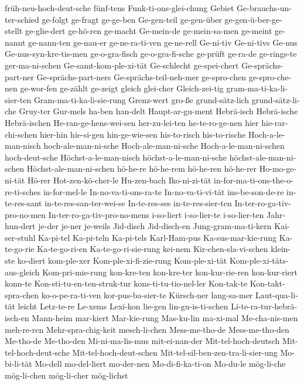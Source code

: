 {früh-neu-hoch-deut-sche
fünf-tens
Funk-ti-ons-glei-chung
Gebiet
Ge-brauchs-un-ter-schied
ge-folgt
ge-fragt
ge-ge-ben
Ge-gen-teil
ge-gen-über
ge-gen-ü-ber-ge-stellt
ge-glie-dert
ge-hö-ren
ge-macht
Ge-mein-de
ge-mein-sa-men
ge-meint
ge-nannt
ge-nann-ten
ge-nau-er
ge-ne-ra-ti-ven
ge-ne-rell
Ge-ni-tiv
Ge-ni-tivs
Ge-nus
Ge-nus-syn-kre-tis-men
ge-o-gra-fisch
ge-o-gra-fi-sche
ge-prüft
ge-ra-de
ge-rings-te
ger-ma-ni-schen
Ge-samt-kom-ple-xi-tät
Ge-schlecht
ge-spei-chert
Ge-sprächs-part-ner
Ge-sprächs-part-ners
Ge-sprächs-teil-neh-mer
ge-spro-chen
ge-spro-che-nen
ge-wor-fen
ge-zählt
ge-zeigt
gleich
glei-cher
Gleich-zei-tig
gram-ma-ti-ka-li-sier-ten
Gram-ma-ti-ka-li-sie-rung
Grenz-wert
gro-ße
grund-sätz-lich
grund-sätz-li-che
Gruy-ter
Gur-mels
ha-ben
han-delt
Haupt-ar-gu-ment
Hebrä-isch
Hebrä-ische
Hebrä-ischen
He-ran-ge-hens-wei-sen
her-zu-lei-ten
he-te-ro-ge-nen
hier
hie-rar-chi-schen
hier-hin
hie-si-gen
hin-ge-wie-sen
his-to-risch
his-to-rische
Hoch-a-le-man-nisch
hoch-ale-man-ni-sche
Hoch-ale-man-ni-sche
Hoch-a-le-man-ni-schen
hoch-deut-sche
Höchst-a-le-man-nisch
höchst-a-le-man-ni-sche
höchst-ale-man-ni-schen
Höchst-ale-man-ni-schen
hö-he-re
hö-he-rem
hö-he-ren
hö-he-rer
Ho-mo-ge-ni-tät
Hö-rer
Hot-zen-kö-cher-le
Hu-zen-bach
Iko-ni-zi-tät
in-for-ma-ti-ons-the-o-re-ti-sches
in-for-mel-le
In-no-va-ti-ons-ra-te
In-no-va-ti-vi-tät
ins-be-son-de-re
in-te-res-sant
in-te-res-san-ter-wei-se
In-te-res-ses
in-te-res-sier-ten
In-ter-ro-ga-tiv-pro-no-men
In-ter-ro-ga-tiv-pro-no-mens
i-so-liert
i-so-lier-te
i-so-lier-ten
Jahr-hun-dert
je-der
je-ner
je-weils
Jid-disch
Jid-disch-en
Jung-gram-ma-ti-kern
Kai-ser-stuhl
Ka-pi-tel
Ka-pi-teln
Ka-pi-tels
Karl-Ham-pus
Ka-sus-mar-kie-rung
Ka-te-go-rie
Ka-te-go-ri-en
Ka-te-go-ri-sie-rung
kei-nem
Kir-chen-sla-vi-schen
klein-ste
ko-diert
kom-ple-xer
Kom-ple-xi-fi-zie-rung
Kom-ple-xi-tät
Kom-ple-xi-täts-aus-gleich
Kom-pri-mie-rung
kon-kre-ten
kon-kre-ter
kon-kur-rie-ren
kon-kur-riert
konn-te
Kon-sti-tu-en-ten-struk-tur
kons-ti-tu-tio-nel-ler
Kon-tak-te
Kon-takt-spra-chen
ko-o-pe-ra-ti-ven
kor-pus-ba-sier-te
Kürsch-ner
lang-sa-mer
Laut-qua-li-tät
leicht
Letz-te-re
Le-xems
Lexi-kon
lie-gen
lin-gu-is-ti-schen
Li-te-ra-tur-hebrä-isch-en
Mann-heim
mar-kiert
Mar-kie-rung
Mas-ku-lin
ma-xi-mal
Me-cha-nis-men
meh-re-ren
Mehr-spra-chig-keit
mesch-li-chen
Mess-me-tho-de
Mess-me-tho-den
Me-tho-de
Me-tho-den
Mi-ni-ma-lis-mus
mit-ei-nan-der
Mit-tel-hoch-deutsch
Mit-tel-hoch-deut-sche
Mit-tel-hoch-deut-schen
Mit-tel-sil-ben-zen-tra-li-sier-ung
Mo-bi-li-tät
Mo-dell
mo-del-liert
mo-der-nen
Mo-di-fi-ka-ti-on
Mo-du-le
mög-li-che
mög-li-chen
mög-li-cher
mög-lichst
}
